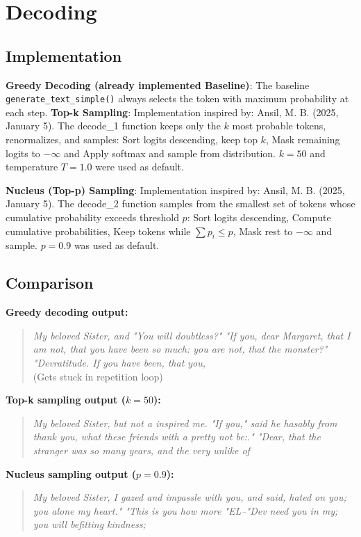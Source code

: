 \documentclass[11pt,a4paper]{article}
\begin{document}
\section{Decoding}
\subsection{Implementation}

\textbf{Greedy Decoding (already implemented Baseline)}:
The baseline \texttt{generate\_text\_simple()} always selects the token with maximum probability at each step.
\textbf{Top-k Sampling}:
Implementation inspired by: Ansil, M. B. (2025, January 5).
The decode\_1 function keeps only the $k$ most probable tokens, renormalizes, and samples: Sort logits descending, keep top $k$, 
Mask remaining logits to $-\infty$ and Apply softmax and sample from distribution.
$k=50$ and temperature $T=1.0$ were used as default.

\textbf{Nucleus (Top-p) Sampling}:
Implementation inspired by: Ansil, M. B. (2025, January 5).
The decode\_2 function samples from the smallest set of tokens whose cumulative probability exceeds threshold $p$: Sort logits descending, 
Compute cumulative probabilities, Keep tokens while $\sum p_i \leq p$, Mask rest to $-\infty$ and sample.
$p=0.9$ was used as default.

\subsection{Comparison}

\textbf{Greedy decoding output:}
\begin{quote}
\textit{My beloved Sister, and "You will doubtless?"  "If you, dear Margaret, that I am not, that you have been so much: you are not, that the monster?" "Devratitude. If you have been, that you,} \\
(Gets stuck in repetition loop)
\end{quote}

\textbf{Top-k sampling output ($k=50$):}
\begin{quote}
\textit{My beloved Sister, but not a inspired me.  "If you," said he hasably from thank you, what these friends with a pretty not be:."   "Dear, that the stranger was so many years, and the very unlike of}
\end{quote}

\textbf{Nucleus sampling output ($p=0.9$):}
\begin{quote}
\textit{My beloved Sister, I gazed and impassle with you, and said, hated on you; you alone my heart."    "This is you how more "EL--"Dev need you in my; you will befitting kindness;}
\end{quote}
\end{document}
